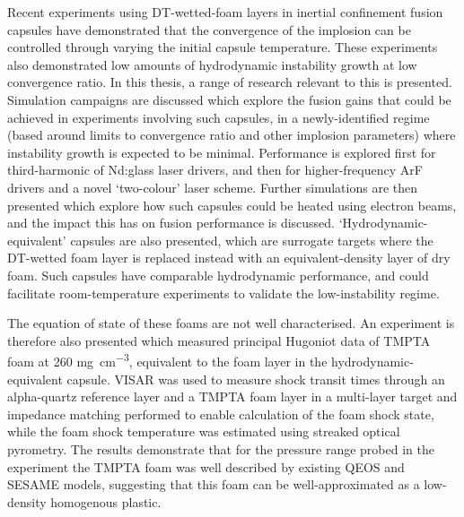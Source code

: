Recent experiments using DT-wetted-foam layers in inertial confinement fusion capsules have demonstrated that the convergence of the implosion can be controlled through varying the initial capsule temperature. These experiments also demonstrated low amounts of hydrodynamic instability growth at low convergence ratio. In this thesis, a range of research relevant to this is presented. Simulation campaigns are discussed which explore the fusion gains that could be achieved in experiments involving such capsules, in a newly-identified regime (based around limits to convergence ratio and other implosion parameters) where instability growth is expected to be minimal. Performance is explored first for third-harmonic of Nd:glass laser drivers, and then for higher-frequency ArF drivers and a novel `two-colour' laser scheme. Further simulations are then presented which explore how such capsules could be heated using electron beams, and the impact this has on fusion performance is discussed. `Hydrodynamic-equivalent' capsules are also presented, which are surrogate targets where the DT-wetted foam layer is replaced instead with an equivalent-density layer of dry foam. Such capsules have comparable hydrodynamic performance, and could facilitate room-temperature experiments to validate the low-instability regime.

The equation of state of these foams are not well characterised. An experiment is therefore also presented which measured principal Hugoniot data of TMPTA foam at 260 \unit{\milli\gram\per\centi\meter\cubed}, equivalent to the foam layer in the hydrodynamic-equivalent capsule. VISAR was used to measure shock transit times through an alpha-quartz reference layer and a TMPTA foam layer in a multi-layer target and impedance matching performed to enable calculation of the foam shock state, while the foam shock temperature was estimated using streaked optical pyrometry. The results demonstrate that for the pressure range probed in the experiment the TMPTA foam was well described by existing QEOS and SESAME models, suggesting that this foam can be well-approximated as a low-density homogenous plastic.